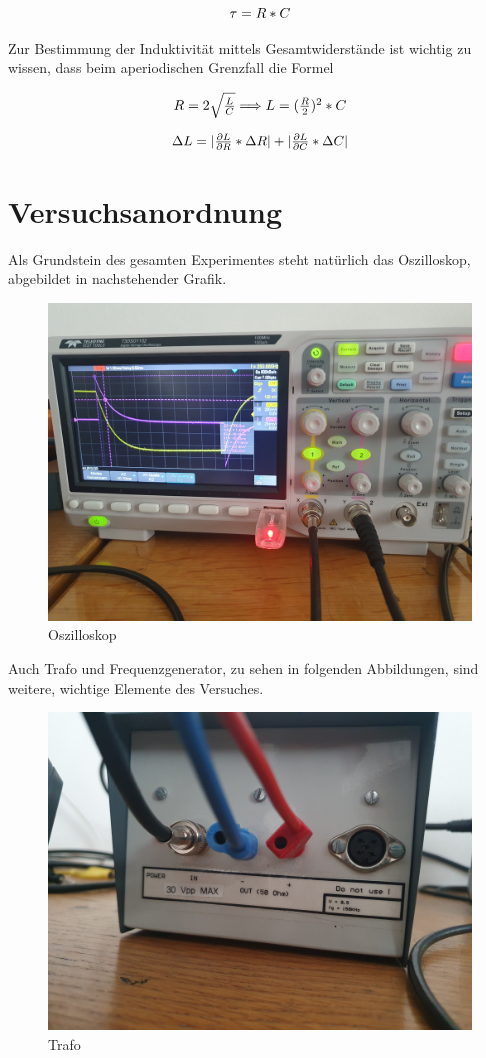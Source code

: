 \documentclass[12pt,a4paper,twoside]{article}
\begin{document}
\begin{equation}
    \label{eq:Zerfallskonstante}
    \centerline{$\tau = R*C$}
\end{equation}

\noindent
Zur Bestimmung der Induktivität mittels Gesamtwiderstände ist wichtig zu wissen, dass beim aperiodischen Grenzfall die Formel

\begin{equation}
    \label{eq:Induktivität}
    \centerline{$R = 2\sqrt{\frac{L}{C}} \Longrightarrow L = (\frac{R}{2})^2*C$}
\end{equation}

\begin{equation}
    \label{eq:UnsicherheitInduktivität}
    \centerline{$\Delta L = \vert \frac{\partial L}{\partial R} * \Delta R \vert + \vert \frac{\partial L}{\partial C} * \Delta C \vert $}
\end{equation}



\section{Versuchsanordnung} %

Als Grundstein des gesamten Experimentes steht natürlich das Oszilloskop, abgebildet in nachstehender Grafik.

\begin{figure}[H]
    \centering
    \includegraphics[width=0.6\linewidth, angle=0]{nudes/Osziloskop.jpg}
    \caption{Oszilloskop}
    \label{fig:Oszilloskop}
\end{figure}

\noindent
Auch Trafo und Frequenzgenerator, zu sehen in folgenden Abbildungen, sind weitere, wichtige Elemente des Versuches. 

\begin{figure}[H]
    \centering
    \includegraphics[width=0.6\linewidth, angle=0]{nudes/Trafo.jpg}
    \caption{Trafo}
    \label{fig:Trafo}
\end{figure}
\end{document}
